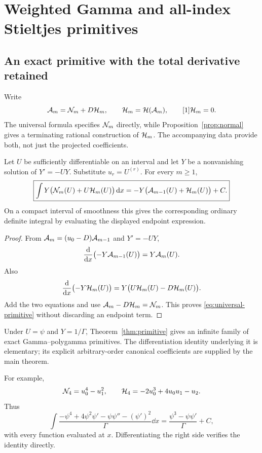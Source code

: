 \section{Weighted Gamma and all-index Stieltjes primitives}
\label{sec:primitives}

\subsection{An exact primitive with the total derivative retained}

Write
\[
 \mathcal A_m=\mathcal N_m+D\mathcal H_m,\qquad \mathcal H_m=\mathcal H(\mathcal A_m),
 \qquad [1]\mathcal H_m=0.
\]
The universal formula specifies $\mathcal N_m$ directly, while Proposition~\ref{prop:normal} gives a terminating rational construction of $\mathcal H_m$. The accompanying data provide both, not just the projected coefficients.

\begin{theorem}\label{thm:primitive}
Let $U$ be sufficiently differentiable on an interval and let $Y$ be a nonvanishing solution of $Y'=-UY$. Substitute $u_r=U^{(r)}$. For every $m\ge1$,
\begin{equation}\label{eq:universal-primitive}
 \boxed{\displaystyle
 \int Y\bigl(\mathcal N_m(U)+U\mathcal H_m(U)\bigr)\,\mathrm d x
 =-Y\bigl(\mathcal A_{m-1}(U)+\mathcal H_m(U)\bigr)+C.}
\end{equation}
On a compact interval of smoothness this gives the corresponding ordinary definite integral by evaluating the displayed endpoint expression.
\end{theorem}
\begin{proof}
From $\mathcal A_m=(u_0-D)\mathcal A_{m-1}$ and $Y'=-UY$,
\[
 \frac{\mathrm d}{\mathrm dx}\bigl(-Y\mathcal A_{m-1}(U)\bigr)=Y\mathcal A_m(U).
\]
Also
\[
 \frac{\mathrm d}{\mathrm dx}\bigl(-Y\mathcal H_m(U)\bigr)
 =Y\bigl(U\mathcal H_m(U)-D\mathcal H_m(U)\bigr).
\]
Add the two equations and use $\mathcal A_m-D\mathcal H_m=\mathcal N_m$. This proves \eqref{eq:universal-primitive} without discarding an endpoint term.
\end{proof}

Under $U=\psi$ and $Y=1/\Gamma$, Theorem~\ref{thm:primitive} gives an infinite family of exact Gamma--polygamma primitives. The differentiation identity underlying it is elementary; its explicit arbitrary-order canonical coefficients are supplied by the main theorem.

For example,
\[
 \mathcal N_4=u_0^4-u_1^2,\qquad
 \mathcal H_4=-2u_0^3+4u_0u_1-u_2.
\]
Thus
\begin{equation}\label{eq:gamma4-primitive}
 \int\frac{-\psi^4+4\psi^2\psi'-\psi\psi''-(\psi')^2}{\Gamma}\dd x
 =\frac{\psi^3-\psi\psi'}{\Gamma}+C,
\end{equation}
with every function evaluated at $x$. Differentiating the right side verifies the identity directly.

